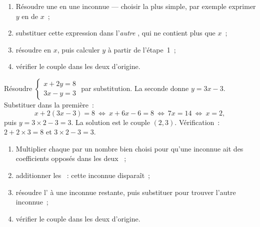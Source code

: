 \begin{method}[Substitution]\label{met:g10:lines:substitution}
\begin{enumerate}
  \item Résoudre une  en une inconnue --- choisir la plus
        simple, par exemple exprimer $y$ en  de $x$~;
  \item substituer cette expression dans l'\emph{autre} , qui ne
        contient plus que $x$~;
  \item résoudre en $x$, puis calculer $y$ à partir de l'étape~1~;
  \item vérifier le couple dans les deux  d'origine.
\end{enumerate}
\end{method}

\begin{example}\label{ex:g10:lines:substitution}
Résoudre $\begin{cases} x + 2y = 8 \\ 3x - y = 3 \end{cases}$ par
substitution. La seconde  donne $y = 3x - 3$. Substituer dans la
première~:
\[
x + 2(3x - 3) = 8
\ \Longleftrightarrow\
x + 6x - 6 = 8
\ \Longleftrightarrow\
7x = 14
\ \Longleftrightarrow\
x = 2 ,
\]
puis $y = 3 \times 2 - 3 = 3$. La solution est le couple $(2, 3)$.
Vérification~: $2 + 2 \times 3 = 8$ et $3 \times 2 - 3 = 3$.
\end{example}

\begin{method}[Combinaison]\label{met:g10:lines:elimination}
\begin{enumerate}
  \item Multiplier chaque  par un nombre bien choisi pour qu'une
        inconnue ait des coefficients opposés dans les deux ~;
  \item additionner les ~: cette inconnue disparaît~;
  \item résoudre l'\omterm{def:g10:algebra:equation}{équation} à une inconnue restante, puis substituer pour
        trouver l'autre inconnue~;
  \item vérifier le couple dans les deux \omterm{def:g10:algebra:equation}{équations} d'origine.
\end{enumerate}
\end{method}

